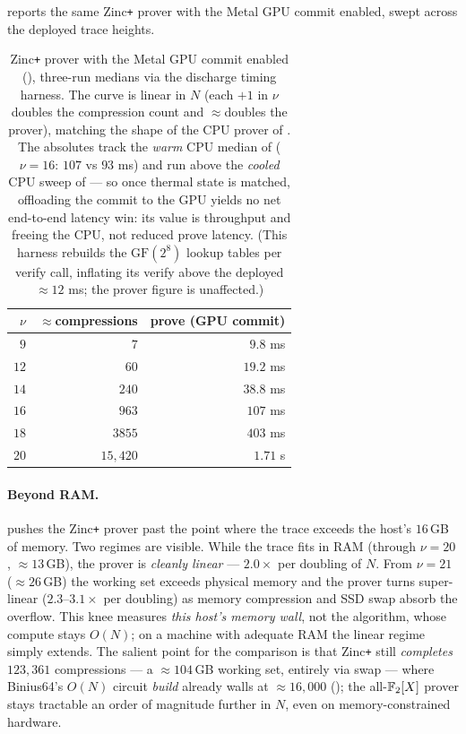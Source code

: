  reports the same Zinc\texttt{+} prover with the Metal
GPU commit enabled, swept across the deployed trace heights.

\begin{table}[h]
\centering
\renewcommand{\arraystretch}{1.2}
\begin{tabular}{r r r}
\toprule
$\nu$ & $\approx$compressions & prove (GPU commit) \\
\midrule
$9$  & $7$        & $9.8$ ms \\
$12$ & $60$       & $19.2$ ms \\
$14$ & $240$      & $38.8$ ms \\
$16$ & $963$      & $107$ ms \\
$18$ & $3855$     & $403$ ms \\
$20$ & $15{,}420$ & $1.71$ s \\
\bottomrule
\end{tabular}
\caption{Zinc\texttt{+} prover with the Metal GPU commit enabled
(), three-run medians via the discharge timing harness.
The curve is linear in $N$ (each $+1$ in $\nu$ doubles the compression count
and $\approx$doubles the prover), matching the shape of the CPU prover of
. The absolutes track the \emph{warm} CPU median of
 ($\nu{=}16$: $107$ vs $93$ ms) and run above the
\emph{cooled} CPU sweep of  --- so once thermal state is
matched, offloading the commit to the GPU yields no net end-to-end latency
win: its value is throughput and freeing the CPU, not reduced prove latency.
(This harness rebuilds the $\mathrm{GF}(2^8)$ lookup tables per verify call,
inflating its verify above the deployed $\approx\!12$ ms; the prover figure
is unaffected.)}
\label{tab:scaling-gpu}
\end{table}

\paragraph{Beyond RAM.}  pushes the Zinc\texttt{+}
prover past the point where the trace exceeds the host's $16$\,GB of memory.
Two regimes are visible. While the trace fits in RAM (through $\nu{=}20$,
$\approx\!13$\,GB), the prover is \emph{cleanly linear} --- $2.0\times$ per
doubling of $N$. From $\nu{=}21$ ($\approx\!26$\,GB) the working set exceeds
physical memory and the prover turns super-linear ($2.3$--$3.1\times$ per
doubling) as memory compression and SSD swap absorb the overflow. This knee
measures \emph{this host's memory wall}, not the algorithm, whose compute
stays $O(N)$; on a machine with adequate RAM the linear regime simply extends.
The salient point for the comparison is that Zinc\texttt{+} still
\emph{completes} $123{,}361$ compressions --- a $\approx\!104$\,GB working set,
entirely via swap --- where Binius64's $O(N)$ circuit \emph{build} already walls
at $\approx\!16{,}000$ (); the all-$\mathbb{F}_2[X]$ prover stays
tractable an order of magnitude further in $N$, even on memory-constrained
hardware.

